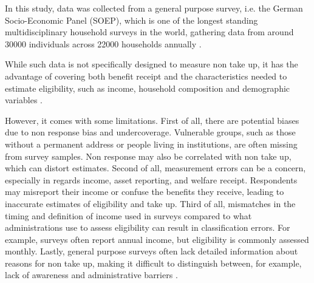 In this study, data was collected from a general purpose survey, i.e. the German Socio-Economic Panel (SOEP), which is one of the longest standing multidisciplinary household surveys in the world, gathering data from around 30000 individuals across 22000 households annually \citep{berlin_diw_nodate}.

While such data is not specifically designed to measure non take up, it has the advantage of covering both benefit receipt and the characteristics needed to estimate eligibility, such as income, household composition and demographic variables \citep{mechelen_who_2017}.

However, it comes with some limitations. First of all, there are potential biases due to non response bias and undercoverage. Vulnerable groups, such as those without a permanent address or people living in institutions, are often missing from survey samples. Non response may also be correlated with non take up, which can distort estimates. Second of all, measurement errors can be a concern, especially in regards income, asset reporting, and welfare receipt. Respondents may misreport their income or confuse the benefits they receive, leading to inaccurate estimates of eligibility and take up. Third of all, mismatches in the timing and definition of income used in surveys compared to what administrations use to assess eligibility can result in classification errors. For example, surveys often report annual income, but eligibility is commonly assessed monthly. Lastly, general purpose surveys often lack detailed information about reasons for non take up, making it difficult to distinguish between, for example, lack of awareness and administrative barriers \citep{mechelen_who_2017}.